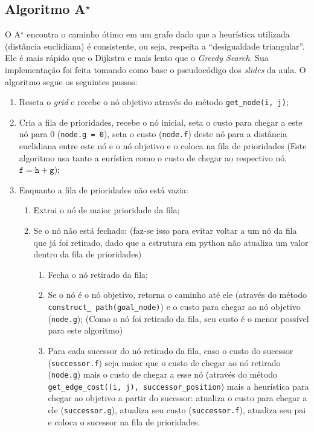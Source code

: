 \documentclass[brazil, 12pt]{article}
\begin{document}
\subsection{Algoritmo A$^{\star}$}
O A$^{\star}$ encontra o caminho ótimo em um grafo dado que a heurística utilizada (distância euclidiana) é consistente, ou seja, respeita a ``desigualdade triangular''. Ele é mais rápido que o Dijkstra e mais lento que o \textit{Greedy Search}. Sua implementação foi feita tomando como base o pseudocódigo dos \textit{slides} da aula. O algoritmo segue os seguintes passos:
\begin{enumerate}
	\item Reseta o \textit{grid} e recebe o nó objetivo através do método \texttt{get\_node(i, j)};
	\item Cria a fila de prioridades, recebe o nó inicial, seta o custo para chegar a este nó para 0 (\texttt{node.g = 0}), seta o custo (\texttt{node.f}) deste nó para a distância euclidiana entre este nó e o nó objetivo e o coloca na fila de prioridades \textcolor{blue!70}{(Este algoritmo usa tanto a eurística como o custo de chegar ao respectivo nó, $\mathtt{f}=\mathtt{h}+\mathtt{g}$)};
	\item Enquanto a fila de prioridades não está vazia:
	\begin{enumerate}
		\item Extrai o nó de maior prioridade da fila;
		\item Se o nó não está fechado: \textcolor{blue!70}{(faz-se isso para evitar voltar a um nó da fila que já foi retirado, dado que a estrutura em python não atualiza um valor dentro da fila de prioridades)}
		\begin{enumerate}
			\item Fecha o nó retirado da fila;
			\item Se o nó é o nó objetivo, retorna o caminho até ele (através do método \texttt{construct\_ path(goal\_node)}) e o custo para chegar ao nó objetivo (\texttt{node.g}); \textcolor{blue!70}{(Como o nó foi retirado da fila, seu custo é o menor possível para este algoritmo)}
			\item Para cada sucessor do nó retirado da fila, caso o custo do sucessor (\texttt{successor.f}) seja maior que o custo de chegar ao nó retirado (\texttt{node.g}) mais o custo de chegar a esse nó (através do método \texttt{get\_edge\_cost((i, j), successor\_position}) mais a heurística para chegar ao objetivo a partir do sucessor: atualiza o custo para chegar a ele (\texttt{successor.g}), atualiza seu custo (\texttt{successor.f}), atualiza seu pai e coloca o sucessor na fila de prioridades.
		\end{enumerate}
	\end{enumerate}
\end{enumerate}
\end{document}
